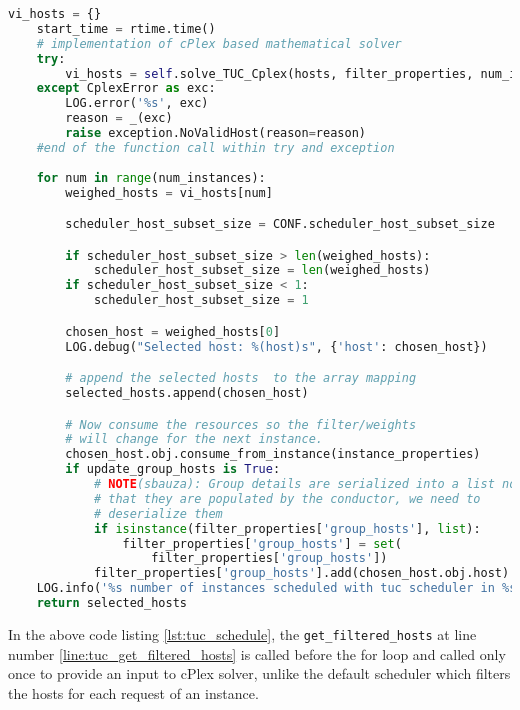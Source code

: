 \begin{lstlisting}[frame=single, language=Python, caption={The cPlex based TUC\_scheduler's \_schedule function}, label={lst:tuc_schedule}, escapechar=|]
	vi_hosts = {}
	start_time = rtime.time()
	# implementation of cPlex based mathematical solver
	try:
		vi_hosts = self.solve_TUC_Cplex(hosts, filter_properties, num_instances)|\label{line:solve_TUC_Cplex}|
	except CplexError as exc:
		LOG.error('%s', exc)
		reason = _(exc)
		raise exception.NoValidHost(reason=reason)
	#end of the function call within try and exception
	
	for num in range(num_instances):
		weighed_hosts = vi_hosts[num]

		scheduler_host_subset_size = CONF.scheduler_host_subset_size

		if scheduler_host_subset_size > len(weighed_hosts):
			scheduler_host_subset_size = len(weighed_hosts)
		if scheduler_host_subset_size < 1:
			scheduler_host_subset_size = 1

		chosen_host = weighed_hosts[0]
		LOG.debug("Selected host: %(host)s", {'host': chosen_host})

		# append the selected hosts  to the array mapping
		selected_hosts.append(chosen_host)

		# Now consume the resources so the filter/weights
		# will change for the next instance.
		chosen_host.obj.consume_from_instance(instance_properties)
		if update_group_hosts is True:
			# NOTE(sbauza): Group details are serialized into a list now
			# that they are populated by the conductor, we need to
			# deserialize them
			if isinstance(filter_properties['group_hosts'], list):
				filter_properties['group_hosts'] = set(
					filter_properties['group_hosts'])
			filter_properties['group_hosts'].add(chosen_host.obj.host)
	LOG.info('%s number of instances scheduled with tuc scheduler in %s seconds' % (num_instances, (rtime.time() - start_time)))
	return selected_hosts
\end{lstlisting}

In the above code listing \ref{lst:tuc_schedule}, the \verb|get_filtered_hosts| at line number \ref{line:tuc_get_filtered_hosts} is called before the for loop and called only once to provide an input to cPlex solver, unlike the default scheduler which filters the hosts for each request of an instance.

